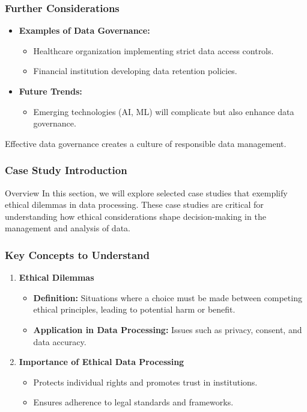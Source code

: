 \documentclass[aspectratio=169]{beamer}
\begin{document}
\begin{frame}[fragile]
    \frametitle{Further Considerations}
    \begin{itemize}
        \item \textbf{Examples of Data Governance:}
        \begin{itemize}
            \item Healthcare organization implementing strict data access controls.
            \item Financial institution developing data retention policies.
        \end{itemize}
        
        \item \textbf{Future Trends:} 
        \begin{itemize}
            \item Emerging technologies (AI, ML) will complicate but also enhance data governance.
        \end{itemize}
    \end{itemize}
    Effective data governance creates a culture of responsible data management.
\end{frame}

\begin{frame}[fragile]
    \frametitle{Case Study Introduction}
    \begin{block}{Overview}
        In this section, we will explore selected case studies that exemplify ethical dilemmas in data processing. These case studies are critical for understanding how ethical considerations shape decision-making in the management and analysis of data.
    \end{block}
\end{frame}

\begin{frame}[fragile]
    \frametitle{Key Concepts to Understand}

    \begin{enumerate}
        \item \textbf{Ethical Dilemmas}
            \begin{itemize}
                \item \textbf{Definition:} Situations where a choice must be made between competing ethical principles, leading to potential harm or benefit.
                \item \textbf{Application in Data Processing:} Issues such as privacy, consent, and data accuracy.
            \end{itemize}

        \item \textbf{Importance of Ethical Data Processing}
            \begin{itemize}
                \item Protects individual rights and promotes trust in institutions.
                \item Ensures adherence to legal standards and frameworks.
            \end{itemize}
    \end{enumerate}
\end{frame}
\end{document}
